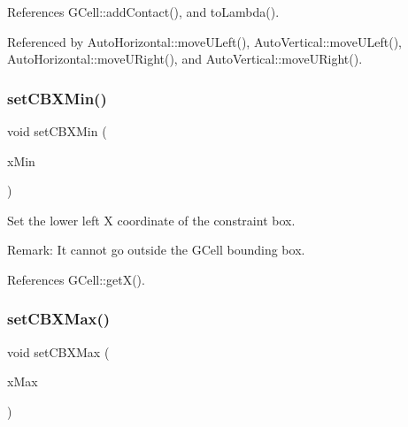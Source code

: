 References G\+Cell\+::add\+Contact(), and to\+Lambda().



Referenced by Auto\+Horizontal\+::move\+U\+Left(), Auto\+Vertical\+::move\+U\+Left(), Auto\+Horizontal\+::move\+U\+Right(), and Auto\+Vertical\+::move\+U\+Right().

\mbox{\label{classKatabatic_1_1AutoContact_a9fcb986110e79bc0044f7bfe503acc0c}} 
\subsubsection{\texorpdfstring{set\+C\+B\+X\+Min()}{setCBXMin()}}
{\footnotesize\ttfamily void set\+C\+B\+X\+Min (\begin{DoxyParamCaption}\item[{\textbf{ Db\+U\+::\+Unit}}]{x\+Min }\end{DoxyParamCaption})\hspace{0.3cm}{\ttfamily [inline]}}

Set the lower left X coordinate of the constraint box.

\begin{DoxyParagraph}{Remark\+: It cannot go outside the G\+Cell bounding box. }

\end{DoxyParagraph}


References G\+Cell\+::get\+X().

\mbox{\label{classKatabatic_1_1AutoContact_aaa7652f5db46cab9edb066d06ea979f9}} 
\subsubsection{\texorpdfstring{set\+C\+B\+X\+Max()}{setCBXMax()}}
{\footnotesize\ttfamily void set\+C\+B\+X\+Max (\begin{DoxyParamCaption}\item[{\textbf{ Db\+U\+::\+Unit}}]{x\+Max }\end{DoxyParamCaption})\hspace{0.3cm}{\ttfamily [inline]}}

